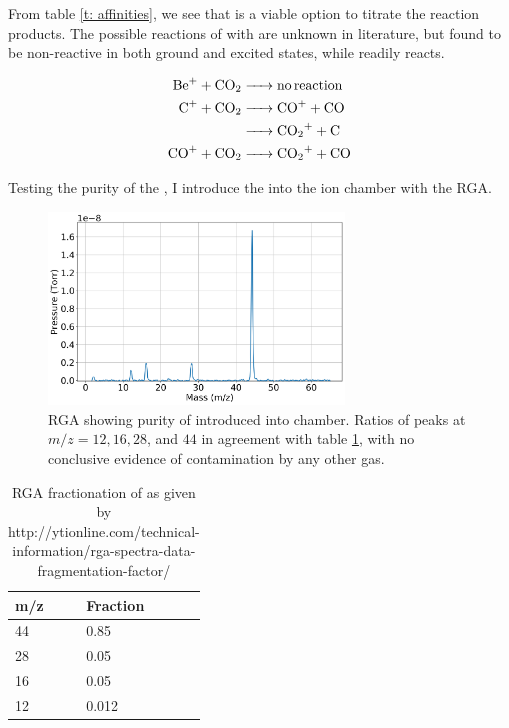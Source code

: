 From table \ref{t: affinities}, we see that  is a viable option to titrate the reaction products. The possible reactions of  with  are unknown in literature, but found to be non-reactive in both ground and excited states, while  readily reacts.

\begin{align}
	\ce{Be+ + CO2 & -> no reaction} \nonumber \\
	\ce{C+ + CO2 & -> CO+ + CO} \label{r: C+CO2->CO} \\
	\ce{& -> CO2+ + C} \label{r: C+CO2->CO2} \\
	\ce{CO+ + CO2 & -> CO2+ + CO} \label{r: CO+CO2->CO2}
\end{align}

Testing the purity of the , I introduce the  into the ion chamber with the RGA.

\begin{figure}[H]
	\centering
	\includegraphics[width=0.7\textwidth]{images/C_CO2_rga.png}
	\caption{\label{fig: cco2 rga} RGA showing purity of  introduced into chamber. Ratios of  peaks at $m/z = 12, 16, 28$, and $44$ in agreement with table \ref{t: cco2 fractionation}, with no conclusive evidence of contamination by any other gas.}
\end{figure}

\begin{table}[H]
	\centering
	\label{t: cco2 fractionation}
	\begin{tabular}{|l|l| }
	\hline
	m/z & Fraction \\
	\hline
	44 & 0.85 \\
	28 & 0.05 \\
	16 & 0.05 \\
	12 & 0.012 \\
	\hline
	\end{tabular}
	\caption{RGA fractionation of  as given by http://ytionline.com/technical-information/rga-spectra-data-fragmentation-factor/}
\end{table}

